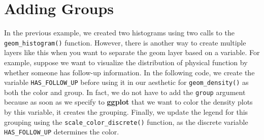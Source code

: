 \documentclass[
  letterpaper,
]{latex/krantz}
\makeatletter
\newenvironment{Shaded}{\begin{snugshade}}{\end{snugshade}}
\newcommand{\AttributeTok}[1]{\textcolor[rgb]{0.40,0.45,0.13}{#1}}
\newcommand{\DecValTok}[1]{\textcolor[rgb]{0.68,0.00,0.00}{#1}}
\newcommand{\FunctionTok}[1]{\textcolor[rgb]{0.28,0.35,0.67}{#1}}
\newcommand{\NormalTok}[1]{\textcolor[rgb]{0.00,0.23,0.31}{#1}}
\newcommand{\OtherTok}[1]{\textcolor[rgb]{0.00,0.23,0.31}{#1}}
\newcommand{\SpecialCharTok}[1]{\textcolor[rgb]{0.37,0.37,0.37}{#1}}
\newcommand{\StringTok}[1]{\textcolor[rgb]{0.13,0.47,0.30}{#1}}
\newenvironment{kframe}{%
\medskip{}
\setlength{\fboxsep}{.8em}
 \def\at@end@of@kframe{}%
 \ifinner\ifhmode%
  \def\at@end@of@kframe{\end{minipage}}%
  \begin{minipage}{\columnwidth}%
 \fi\fi%
 \def\FrameCommand##1{\hskip\@totalleftmargin \hskip-\fboxsep
 \colorbox{shadecolor}{##1}\hskip-\fboxsep
     \hskip-\linewidth \hskip-\@totalleftmargin \hskip\columnwidth}%
 \MakeFramed {\advance\hsize-\width
   \@totalleftmargin\z@ \linewidth\hsize
   \@setminipage}}%
 {\par\unskip\endMakeFramed%
 \at@end@of@kframe}
\renewenvironment{Shaded}{\begin{kframe}}{\end{kframe}}
\makeatother
\begin{document}
\section{\texorpdfstring{Adding Groups
}{Adding Groups }}\label{adding-groups}

In the previous example, we created two histograms using two calls to
the \texttt{geom\_histogram()} function. However, there is another way
to create multiple layers like this when you want to separate the geom
layer based on a variable. For example, suppose we want to visualize the
distribution of physical function by whether someone has follow-up
information. In the following code, we create the variable
\texttt{HAS\_FOLLOW\_UP} before using it in our aesthetic for
\texttt{geom\_density()}
as both the color and group. In fact, we do not have to add the
\texttt{group} argument because as soon as we specify to \textbf{ggplot}
that we want to color the density plots by this variable, it creates the
grouping. Finally, we update the legend for this grouping using the
\texttt{scale\_color\_discrete()}
function, as the discrete variable \texttt{HAS\_FOLLOW\_UP} determines
the color.

\begin{Shaded}
\end{Shaded}
\end{document}
